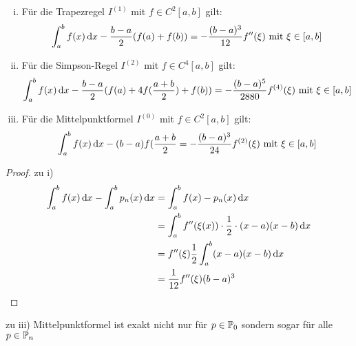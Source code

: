 \documentclass[11pt,a4paper,oneside]{scrartcl}
\begin{document}
\begin{theorem}\hfill
    \begin{enumerate}[i)]
        \item Für die Trapezregel \(I^{(1)}\) mit \(f\in C^2[a,b]\) 
        gilt: \[
        \int^b_af(x)\mathop{}\!\mathrm{d} x-\frac{b-a}{2}(f(a)+f(b)) = -\frac{(b-
        a)^3}{12}f''(\xi) \text{ mit } \xi\in[a,b]
        \]
        \item Für die Simpson-Regel \(I^{(2)}\) mit \(f\in C^4[a,b]\) 
        gilt: \[
        \int^b_af(x)\mathop{}\!\mathrm{d} x-\frac{b-a}{2}(f(a)+4f(\frac{a+b}{2})+f(b)) 
        = 
        -\frac{(b-a)^5}{2880}f^{(4)}(\xi) \text{ mit } \xi\in[a,b]
        \]
        \item Für die Mittelpunktformel \(I^{(0)}\) mit \(f\in 
        C^2[a,b]\) gilt: \[
        \int^b_af(x)\mathop{}\!\mathrm{d} x-(b-a)f(\frac{a+b}{2} = -\frac{(b-
        a)^3}{24}f^{(2)}(\xi) \text{ mit } \xi\in[a,b]
        \]
    \end{enumerate}
\end{theorem}
\begin{proof}
    zu i) \begin{align*}
    \int^b_af(x) \mathop{}\!\mathrm{d} x - \int^b_a p_n(x) \mathop{}\!\mathrm{d} x &= \int^b_a f(x)-
    p_n(x) \mathop{}\!\mathrm{d} 
    x\\
    &=\int^b_a f''(\xi(x))\cdot \frac{1}{2}\cdot(x-a)(x-b)\mathop{}\!\mathrm{d} x\\
    &= f''(\xi)\frac{1}{2}\int^b_a(x-a)(x-b)\mathop{}\!\mathrm{d} x\\
    &= \frac{1}{12}f''(\xi)(b-a)^3
   \end{align*}
\end{proof}
\begin{remark}
    zu iii) Mittelpunktformel ist exakt nicht nur für \(p\in\mathbb{P}_0\) 
    sondern 
    sogar für alle \(p\in\mathbb{P}_n\)
\end{remark}
\end{document}
